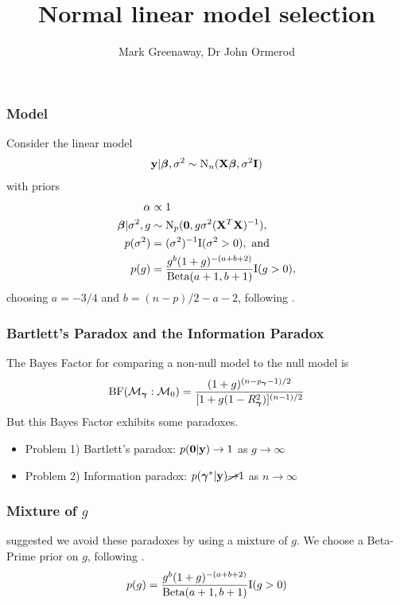 \documentclass{beamer}
\title{Normal linear model selection}
\author{Mark Greenaway, Dr John Ormerod}
\begin{document}
\begin{frame}
	\titlepage
\end{frame}
			
\begin{frame}
	\frametitle{Model}
	Consider the linear model
	\begin{align*}
		{\bf y} | {\boldsymbol \beta}, \sigma^2 \sim \text{N}_n({\bf X} {\boldsymbol \beta}, \sigma^2 {\bf I}) 
	\end{align*}
	with priors
	\begin{align*}
		\alpha & \propto 1 \\
		{\boldsymbol \beta} | \sigma^2, g & \sim \text{N}_p({\bf 0}, g \sigma^2 ({\bf X}^T {\bf X})^{-1}),                     \\
		p(\sigma^2)          & = (\sigma^2)^{-1} \text{I}(\sigma^2 > 0), \text{ and }                    \\
		p(g)                 & = \frac{g^b (1 + g)^{-(a + b + 2)}}{\text{Beta}(a + 1, b + 1)} \text{I}(g > 0), 
	\end{align*}
	choosing $a = -3/4$ and $b = (n-p)/2 - a - 2$, following \citep{Maruyama2011}.
\end{frame}

\begin{frame}
	\frametitle{Bartlett's Paradox and the Information Paradox}
	The Bayes Factor for comparing a non-null model to the null model is
	\[
		\text{BF}(\mathcal{M}_{\boldsymbol \gamma} : \mathcal{M}_0) = \frac{(1 + g)^{(n - p_{\boldsymbol \gamma} - 1)/2}}{[1 + g (1 - R_{\boldsymbol \gamma}^2)]^{(n - 1)/2}}
	\]
	But this Bayes Factor exhibits some paradoxes.
	\begin{itemize}
		\item Problem 1) Bartlett's paradox: $p({\bf 0} | {\bf y}) \to 1$ as $g \to \infty$ \\
		\item Problem 2) Information paradox: $p({\boldsymbol \gamma}^* | {\bf y}) \cancel{\to} 1$ as $n \to \infty$
	\end{itemize}

\end{frame}

\begin{frame}
	\frametitle{Mixture of $g$}
	\citep{Liang2008} suggested we avoid these paradoxes by using a mixture of $g$.
	We choose a Beta-Prime prior on $g$, following \citep{Maruyama2011}.
	\[
		p(g) = \frac{g^b (1 + g)^{-(a + b + 2)}}{\text{Beta}(a + 1, b + 1)} \text{I}(g > 0)
	\]
\end{frame}
\end{document}
